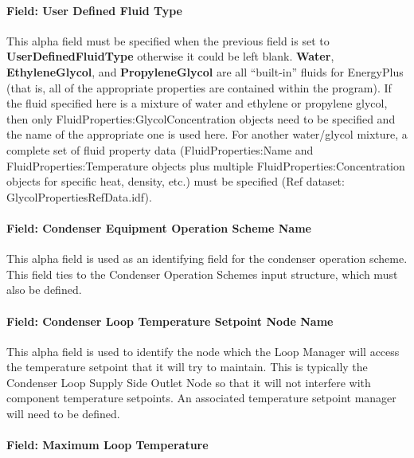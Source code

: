 \paragraph{Field: User Defined Fluid Type}\label{field-user-defined-fluid-type-1}

This alpha field must be specified when the previous field is set to \textbf{UserDefinedFluidType} otherwise it could be left blank. \textbf{Water}, \textbf{EthyleneGlycol}, and \textbf{PropyleneGlycol} are all ``built-in'' fluids for EnergyPlus (that is, all of the appropriate properties are contained within the program). If the fluid specified here is a mixture of water and ethylene or propylene glycol, then only FluidProperties:GlycolConcentration objects need to be specified and the name of the appropriate one is used here. For another water/glycol mixture, a complete set of fluid property data (FluidProperties:Name and FluidProperties:Temperature objects plus multiple FluidProperties:Concentration objects for specific heat, density, etc.) must be specified (Ref dataset: GlycolPropertiesRefData.idf).

\paragraph{Field: Condenser Equipment Operation Scheme Name}\label{field-condenser-equipment-operation-scheme-name}

This alpha field is used as an identifying field for the condenser operation scheme. This field ties to the Condenser Operation Schemes input structure, which must also be defined.

\paragraph{Field: Condenser Loop Temperature Setpoint Node Name}\label{field-condenser-loop-temperature-setpoint-node-name}

This alpha field is used to identify the node which the Loop Manager will access the temperature setpoint that it will try to maintain. This is typically the Condenser Loop Supply Side Outlet Node so that it will not interfere with component temperature setpoints. An associated temperature setpoint manager will need to be defined.

\paragraph{Field: Maximum Loop Temperature}\label{field-maximum-loop-temperature-1}

